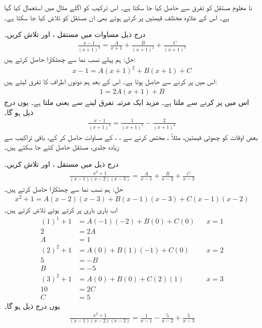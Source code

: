 
نا معلوم مستقل کو تفرق سے حاصل کیا جا سکتا ہے۔ اس ترکیب کو اگلے مثال میں استعمال کیا گیا ہے۔ اس کے علاوہ مختلف قیمتیں پر کرتے ہوئے بھی ان مستقل کو تلاش کیا جا سکتا ہے۔

درج ذیل مساوات میں مستقل ،  اور  تلاش کریں۔
\begin{align*}
\frac{x-1}{(x+1)^3}=\frac{A}{x+1}+\frac{B}{(x+1)^2}+\frac{C}{(x+1)^3}
\end{align*}
حل:\quad
ہم پہلے نسب نما سے چھٹکارا حاصل کرتے ہیں:
\begin{align*}
x-1=A(x+1)^2+B(x+1)+C
\end{align*}
اس میں  پر کرنے سے  حاصل ہوتا ہے۔ اس کے بعد ہم دونوں اطراف کا تفرق لیتے ہیں:
\begin{align*}
1=2A(x+1)+B
\end{align*}
اس میں  پر کرنے سے  ملتا ہے۔ مزید ایک مرتبہ تفرق لینے سے  یعنی  ملتا ہے۔ یوں درج ذیل ہو گا۔
\begin{align*}
\frac{x-1}{(x+1)^3}=\frac{1}{(x+1)^2}-\frac{2}{(x+1)^3}
\end{align*}
بعض اوقات  کو چھوٹی قیمتیں، مثلاً ، مختص کرنے سے ، ،  کے مساوات حاصل کر کے، باقی تراکیب سے زیادہ جلدی، مستقل حاصل کئے جا سکتے ہیں۔

درج ذیل میں مستقل ،  اور  تلاش کریں۔
\begin{align*}
\frac{x^2+1}{(x-1)(x-2)(x-3)}=\frac{A}{x-1}+\frac{B}{x-2}+\frac{C}{x-3}
\end{align*}
حل:\quad
ہم نسب نما سے چھٹکارا حاصل کرتے ہیں۔
\begin{align*}
x^2+1=A(x-2)(x-3)+B(x-1)(x-3)+C(x-1)(x-2)
\end{align*}
اب باری باری  پر کرتے ہوئے  تلاش کرتے ہیں۔
\begin{align*}
(1)^1+1&=A(-1)(-2)+B(0)+C(0)&&x=1\\
2&=2A\\
A&=1\\
(2)^2+1&=A(0)+B(1)(-1)+C(0)&&x=2\\
5&=-B\\
B&=-5\\
(3)^2+1&=A(0)+B(0)+C(2)(1)&&x=3\\
10&=2C\\
C&=5
\end{align*}
یوں درج ذیل ہو گا۔
\begin{align*}
\frac{x^2+1}{(x-1)(x-2)(x-3)}=\frac{1}{x-1}-\frac{5}{x-2}+\frac{5}{x-3}
\end{align*}

